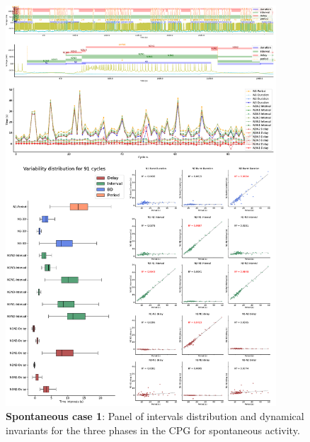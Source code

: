 \begin{figure}[htbp]
	\centering
	\includegraphics[width=0.9\textwidth]{./img/invariants/data/SUSSEX/prep2/images/3phases/panel_with_intervals.pdf}
	\caption{\textbf{Spontaneous case 1}: Panel of intervals distribution and dynamical invariants for the three phases in the CPG for spontaneous activity.}
	\label{fig:prep2 invariants}
\end{figure}

